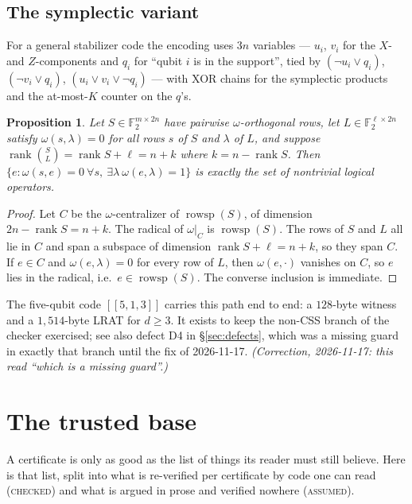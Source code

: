 \documentclass[11pt]{amsart}
\newcommand{\FF}{\mathbb{F}_{2}}
\newcommand{\rowsp}{\operatorname{rowsp}}
\newcommand{\rank}{\operatorname{rank}}
\theoremstyle{plain}
\newtheorem{proposition}[theorem]{Proposition}
\theoremstyle{definition}
\theoremstyle{remark}
\begin{document}
\subsection{The symplectic variant}\label{ssec:symp}
For a general stabilizer code the encoding uses $3n$ variables --- $u_{i}$,
$v_{i}$ for the $X$- and $Z$-components and $q_{i}$ for ``qubit $i$ is in the
support'', tied by $(\lnot u_{i}\vee q_{i})$, $(\lnot v_{i}\vee q_{i})$,
$(u_{i}\vee v_{i}\vee\lnot q_{i})$ --- with XOR chains for the symplectic
products and the at-most-$K$ counter on the $q$'s.

\begin{proposition}\label{prop:symp}
Let $S\in\FF^{m\times 2n}$ have pairwise $\omega$-orthogonal rows, let
$L\in\FF^{\ell\times2n}$ satisfy $\omega(s,\lambda)=0$ for all rows
$s$ of $S$ and $\lambda$ of $L$, and suppose
$\rank\binom{S}{L}=\rank S+\ell=n+k$ where $k=n-\rank S$. Then
$\{e:\omega(s,e)=0\ \forall s,\ \exists\lambda\ \omega(e,\lambda)=1\}$ is
exactly the set of nontrivial logical operators.
\end{proposition}

\begin{proof}
Let $C$ be the $\omega$-centralizer of $\rowsp(S)$, of dimension
$2n-\rank S=n+k$. The radical of $\omega|_{C}$ is $\rowsp(S)$. The rows of $S$
and $L$ all lie in $C$ and span a subspace of dimension $\rank S+\ell=n+k$, so
they span $C$. If $e\in C$ and $\omega(e,\lambda)=0$ for every row of $L$,
then $\omega(e,\cdot)$ vanishes on $C$, so $e$ lies in the radical, i.e.\
$e\in\rowsp(S)$. The converse inclusion is immediate.
\end{proof}

The five-qubit code $[[5,1,3]]$ carries this path end to end: a $128$-byte
witness and a $1{,}514$-byte LRAT for $d\ge3$. It exists to keep the non-CSS
branch of the checker exercised; see also defect D4 in \S\ref{sec:defects},
which was a missing guard in exactly that branch until the fix of
2026-11-17. \emph{(Correction, 2026-11-17: this read ``which is a missing
guard''.)}

\section{The trusted base}\label{sec:tcb}

A certificate is only as good as the list of things its reader must still
believe. Here is that list, split into what is re-verified per certificate by
code one can read (\textsc{checked}) and what is argued in prose and verified
nowhere (\textsc{assumed}).
\end{document}
